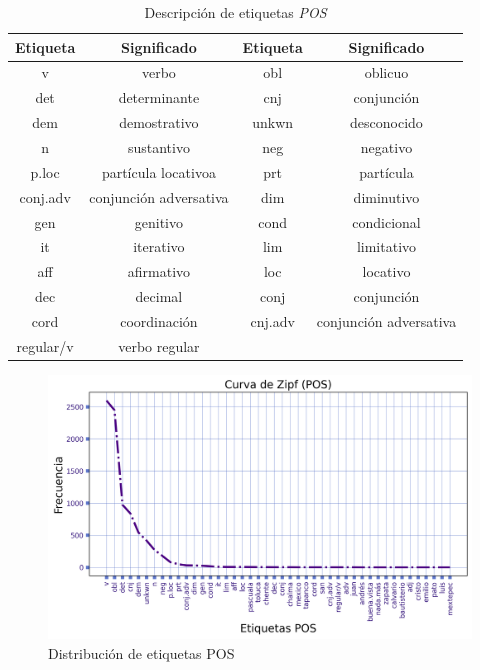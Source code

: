 \documentclass[letterpaper,12pt,oneside]{book}
\newcommand{\note}[4][]{\todo[author=#2,color=#3,size=\scriptsize,fancyline,caption={},#1]{#4}} %
\newcommand{\vic}[2][]{\note[#1]{Vic}{orange!40}{#2}}
\newcommand{\Vic}[2][]{\vic[inline,#1]{#2}\noindent}
\theoremstyle{definition}
\begin{document}
\begin{table}
    \centering
    \begin{tabular}{| c  c | c  c |} \hline
		\textbf{Etiqueta} & \textbf{Significado} & \textbf{Etiqueta} & \textbf{Significado} \\ \hline
		v & verbo & obl & oblicuo \\
		det & determinante & cnj & conjunción \\
		dem & demostrativo & unkwn & desconocido\\ 
		n & sustantivo & neg & negativo \\
		p.loc & partícula locativoa & prt & partícula \\
		conj.adv & conjunción adversativa & dim & diminutivo \\
		gen & genitivo & cond & condicional\\
		it & iterativo & lim & limitativo \\ 
		aff & afirmativo & loc & locativo \\
		dec & decimal & conj & conjunción \\
	    cord & coordinación & cnj.adv & conjunción adversativa \\
	    regular/v & verbo regular & & \\
	    \hline
	\end{tabular}
	\caption{Descripción de etiquetas \textit{POS}}
	\label{table:pos_descr}
\end{table}


\begin{figure}
	\centering
	\includegraphics[width=\textwidth]{zipf_pos}
	\caption{Distribución de etiquetas POS}%
	\label{fig:pos_distrib}
\end{figure}
\end{document}
